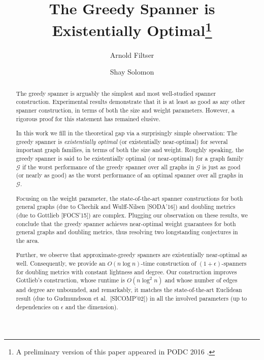 \documentclass[11pt,letterpaper]{article}
\begin{document}
\author[1]{Arnold Filtser}
\author[2]{Shay Solomon}


 

  \title{The Greedy Spanner is Existentially Optimal\footnote{A preliminary version of this paper appeared in PODC 2016 \cite{FS16}.}}
  \maketitle

\begin{abstract}
The greedy spanner is arguably the simplest and most well-studied spanner construction.
Experimental results demonstrate that it is at least as good as any other spanner construction, in terms of both the size and weight parameters.
However, a rigorous proof for this statement has remained elusive.

In this work we fill in the theoretical gap via a surprisingly simple observation: The greedy spanner is \emph{existentially optimal} (or existentially near-optimal)
for several important graph families, in terms of both the size and weight.
Roughly speaking, the greedy spanner is said to be existentially optimal (or near-optimal)
for a graph family $\mathcal G$ if the worst performance of the greedy spanner over all graphs in $\mathcal G$
is just as good (or nearly as good) as the worst performance of an optimal spanner over all graphs in $\mathcal G$.

Focusing on the weight parameter, the state-of-the-art spanner constructions for both general graphs
(due to Chechik and Wulff-Nilsen [SODA'16]) and doubling metrics (due to Gottlieb [FOCS'15]) are complex. Plugging our observation on these results, we conclude that the greedy spanner achieves near-optimal weight guarantees for both general graphs and doubling metrics, thus resolving two longstanding conjectures in the area.

Further, we observe that approximate-greedy spanners are existentially near-optimal as well.
Consequently, we provide an $O(n \log n)$-time construction of $(1+\epsilon)$-spanners for doubling metrics with constant lightness and degree.
Our construction improves Gottlieb's construction, whose runtime is $O(n \log^2 n)$ and whose number of edges and degree are unbounded,
and remarkably, it matches the state-of-the-art Euclidean result (due to  Gudmundsson et al.\ [SICOMP'02]) in all the involved parameters
(up to dependencies on $\epsilon$ and the dimension).
\end{abstract}
\end{document}
